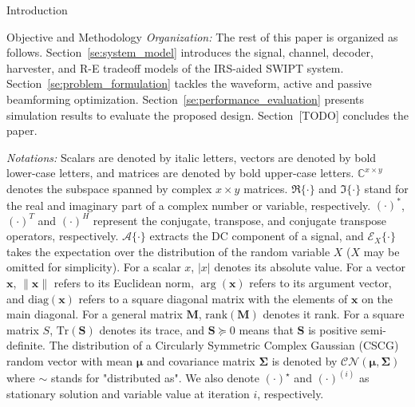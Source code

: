 \documentclass[journal]{IEEEtran}
\begin{document}
\begin{section}{Introduction}
\begin{subsection}{Objective and Methodology}
			\textit{Organization:} The rest of this paper is organized as follows. Section~\ref{se:system_model} introduces the signal, channel, decoder, harvester, and R-E tradeoff models of the IRS-aided SWIPT system. Section~\ref{se:problem_formulation} tackles the waveform, active and passive beamforming optimization. Section~\ref{se:performance_evaluation} presents simulation results to evaluate the proposed design. Section~[TODO] concludes the paper.

			\textit{Notations:} Scalars are denoted by italic letters, vectors are denoted by bold lower-case letters, and matrices are denoted by bold upper-case letters. $\mathbb{C}^{x \times y}$ denotes the subspace spanned by complex $x \times y$ matrices. $\Re\{\cdot\}$ and $\Im\{\cdot\}$ stand for the real and imaginary part of a complex number or variable, respectively. $(\cdot)^*$, $(\cdot)^T$ and $(\cdot)^H$ represent the conjugate, transpose, and conjugate transpose operators, respectively. $\mathcal{A}\{\cdot\}$ extracts the DC component of a signal, and $\mathcal{E}_X\{\cdot\}$ takes the expectation over the distribution of the random variable $X$ ($X$ may be omitted for simplicity). For a scalar $x$, $\lvert{x}\rvert$ denotes its absolute value. For a vector $\boldsymbol{x}$, $\lVert{\boldsymbol{x}}\rVert$ refers to its Euclidean norm, $\arg(\boldsymbol{x})$ refers to its argument vector, and $\mathrm{diag}(\boldsymbol{x})$ refers to a square diagonal matrix with the elements of $\boldsymbol{x}$ on the main diagonal. For a general matrix $\boldsymbol{M}$, $\mathrm{rank}(\boldsymbol{M})$ denotes it rank. For a square matrix $S$, $\mathrm{Tr}(\boldsymbol{S})$ denotes its trace, and $\boldsymbol{S} \succeq 0$ means that $\boldsymbol{S}$ is positive semi-definite. The distribution of a Circularly Symmetric Complex Gaussian (CSCG) random vector with mean $\boldsymbol{\mu}$ and covariance matrix $\boldsymbol{\Sigma}$ is denoted by $\mathcal{CN}(\boldsymbol{\mu},\boldsymbol{\Sigma})$ where $\sim$ stands for "distributed as". We also denote $(\cdot)^{\star}$ and $(\cdot)^{(i)}$ as stationary solution and variable value at iteration $i$, respectively.
		\end{subsection}
	\end{section}
\end{document}
